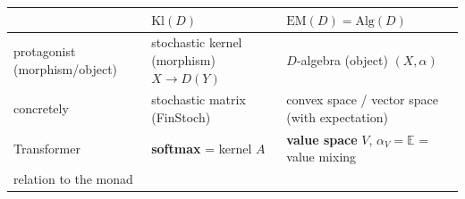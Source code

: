 \documentclass[a4paper,11pt]{article}
\begin{document}
\begin{longtable}[]{@{}lll@{}}
\toprule
\begin{minipage}[b]{0.30\columnwidth}\raggedright
\strut
\end{minipage} & \begin{minipage}[b]{0.30\columnwidth}\raggedright
\(\mathrm{Kl}(D)\)\strut
\end{minipage} & \begin{minipage}[b]{0.30\columnwidth}\raggedright
\(\mathrm{EM}(D)=\mathrm{Alg}(D)\)\strut
\end{minipage}\tabularnewline
\midrule
\endhead
\begin{minipage}[t]{0.30\columnwidth}\raggedright
protagonist (morphism/object)\strut
\end{minipage} & \begin{minipage}[t]{0.30\columnwidth}\raggedright
stochastic kernel (morphism) \(X\to D(Y)\)\strut
\end{minipage} & \begin{minipage}[t]{0.30\columnwidth}\raggedright
\(D\)-algebra (object) \((X,\alpha)\)\strut
\end{minipage}\tabularnewline
\begin{minipage}[t]{0.30\columnwidth}\raggedright
concretely\strut
\end{minipage} & \begin{minipage}[t]{0.30\columnwidth}\raggedright
stochastic matrix (FinStoch)\strut
\end{minipage} & \begin{minipage}[t]{0.30\columnwidth}\raggedright
convex space / vector space (with expectation)\strut
\end{minipage}\tabularnewline
\begin{minipage}[t]{0.30\columnwidth}\raggedright
Transformer\strut
\end{minipage} & \begin{minipage}[t]{0.30\columnwidth}\raggedright
\textbf{softmax} = kernel \(A\)\strut
\end{minipage} & \begin{minipage}[t]{0.30\columnwidth}\raggedright
\textbf{value space} \(V\), \(\alpha_V=\mathbb E\) = value mixing\strut
\end{minipage}\tabularnewline
\begin{minipage}[t]{0.30\columnwidth}\raggedright
relation to the monad\strut
\end{minipage} & \begin{minipage}[t]{0.30\columnwidth}\raggedright

\end{minipage}
\end{longtable}
\end{document}
